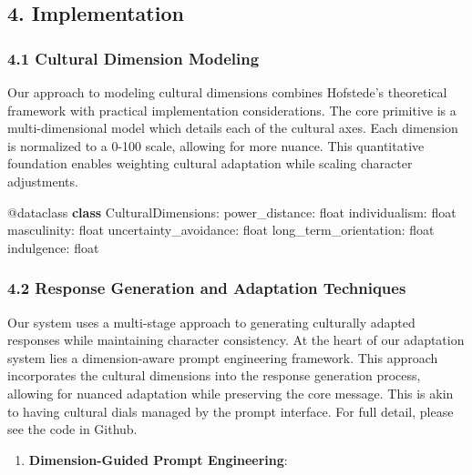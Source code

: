\documentclass[
]{article}
\newenvironment{Shaded}{}{}
\newcommand{\AttributeTok}[1]{\textcolor[rgb]{0.49,0.56,0.16}{#1}}
\newcommand{\BuiltInTok}[1]{\textcolor[rgb]{0.00,0.50,0.00}{#1}}
\newcommand{\KeywordTok}[1]{\textcolor[rgb]{0.00,0.44,0.13}{\textbf{#1}}}
\newcommand{\NormalTok}[1]{#1}
\providecommand{\tightlist}{%
  \setlength{\itemsep}{0pt}\setlength{\parskip}{0pt}}
\begin{document}
\subsection{4. Implementation}\label{implementation}

\subsubsection{4.1 Cultural Dimension
Modeling}\label{cultural-dimension-modeling}

Our approach to modeling cultural dimensions combines Hofstede's theoretical framework with practical implementation considerations. The core primitive is a multi-dimensional model which details each of the cultural axes. Each dimension is normalized to a 0-100 scale, allowing for more nuance. This quantitative foundation enables weighting cultural adaptation while scaling character adjustments.

\begin{Shaded}
\begin{Highlighting}[]
\AttributeTok{@dataclass}
\KeywordTok{class}\NormalTok{ CulturalDimensions:}
\NormalTok{    power\_distance: }\BuiltInTok{float}
\NormalTok{    individualism: }\BuiltInTok{float}
\NormalTok{    masculinity: }\BuiltInTok{float}
\NormalTok{    uncertainty\_avoidance: }\BuiltInTok{float}
\NormalTok{    long\_term\_orientation: }\BuiltInTok{float}
\NormalTok{    indulgence: }\BuiltInTok{float}
\end{Highlighting}
\end{Shaded}

\subsubsection{4.2 Response Generation and Adaptation
Techniques}\label{response-generation-and-adaptation-techniques}

Our system uses a multi-stage approach to generating culturally adapted responses while maintaining character consistency. At the heart of our adaptation system lies a dimension-aware prompt engineering framework. This approach incorporates the cultural dimensions into the response generation process, allowing for nuanced adaptation while preserving the core message. This is akin to having cultural dials managed by the prompt interface. For full detail, please see the code in Github.

\begin{enumerate}
\def\labelenumi{\arabic{enumi}.}
\tightlist
\item
  \textbf{Dimension-Guided Prompt Engineering}:
\end{enumerate}
\end{document}
